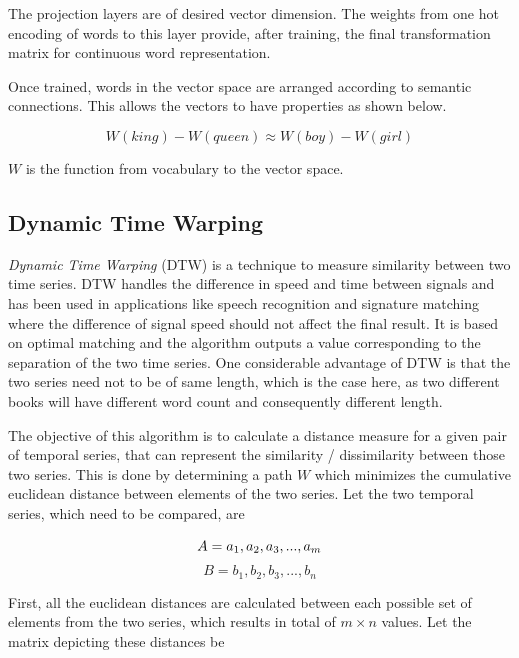 \documentclass[%
 aip,
rsi,%
 amsmath,amssymb,
 reprint,%
author-year,
groupedaddress
]{revtex4-1}
\begin{document}
The projection layers are of desired vector dimension. The weights from one hot encoding of words to this layer provide, after training, the final transformation matrix for continuous word representation.

Once trained, words in the vector space are arranged according to semantic connections. This allows the vectors to have properties as shown below.

\begin{equation*}
W(king) - W(queen) \approx W(boy) - W(girl)
\end{equation*}

$W$ is the function from vocabulary to the vector space.

\subsection{Dynamic Time Warping}
{\sl Dynamic Time Warping} (DTW) is a technique to measure similarity between two time series. DTW handles the difference in speed and time between signals and has been used in applications like speech recognition and signature matching where the difference of signal speed should not affect the final result. It is based on optimal matching and the algorithm outputs a value corresponding to the separation of the two time series. One considerable advantage of DTW is that the two series need not to be of same length, which is the case here, as two different books will have different word count and consequently different length.

The objective of this algorithm is to calculate a distance measure for a given pair of temporal series, that can represent the similarity / dissimilarity between those two series.
This is done by determining a path $W$ which minimizes the cumulative euclidean distance between elements of the two series. Let the two temporal series, which need to be compared, are 

\begin{equation*}
A = a_1, a_2, a_3, ..., a_m \\
\end{equation*}
\begin{equation*}
B = b_1, b_2, b_3, ..., b_n
\end{equation*}

First, all the euclidean distances are calculated between each possible set of elements from the two series, which results in total of $m\times n$ values. Let the matrix depicting these distances be 
\end{document}
